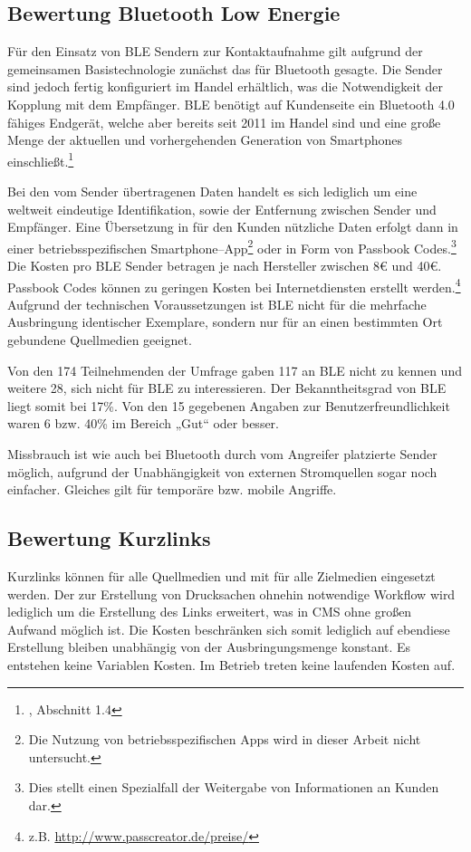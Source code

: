 
\subsection{Bewertung Bluetooth Low Energie} %
\label{sub:bewertung_bluetooth_low_energie}
Für den Einsatz von \ac{BLE} Sendern zur Kontaktaufnahme gilt aufgrund der gemeinsamen Basistechnologie zunächst das für Bluetooth gesagte. Die Sender sind jedoch fertig konfiguriert im Handel erhältlich, was die Notwendigkeit der Kopplung mit dem Empfänger. \ac{BLE} benötigt auf Kundenseite ein Bluetooth 4.0 fähiges Endgerät, welche aber bereits seit 2011 im Handel sind und eine große Menge der aktuellen und vorhergehenden Generation von Smartphones einschließt.\footnote{\cite{gilchrist}, Abschnitt 1.4}

Bei den vom Sender übertragenen Daten handelt es sich lediglich um eine weltweit eindeutige Identifikation, sowie der Entfernung zwischen Sender und Empfänger. Eine Übersetzung in für den Kunden nützliche Daten erfolgt dann in einer betriebsspezifischen Smartphone–App\footnote{Die Nutzung von betriebsspezifischen Apps wird in dieser Arbeit nicht untersucht.} oder in Form von Passbook Codes.\footnote{Dies stellt einen Spezialfall der Weitergabe von Informationen an Kunden dar.} Die Kosten pro BLE Sender betragen je nach Hersteller zwischen 8€ und 40€. Passbook Codes können zu geringen Kosten bei Internetdiensten erstellt werden.\footnote{z.B. \url{http://www.passcreator.de/preise/}} Aufgrund der technischen Voraussetzungen ist \ac{BLE} nicht für die mehrfache Ausbringung identischer Exemplare, sondern nur für an einen bestimmten Ort gebundene Quellmedien geeignet. 

Von den 174 Teilnehmenden der Umfrage gaben 117 an \ac{BLE} nicht zu kennen und weitere 28, sich nicht für \ac{BLE} zu interessieren. Der Bekanntheitsgrad von \ac{BLE} liegt somit bei 17\%. Von den 15 gegebenen Angaben zur Benutzerfreundlichkeit waren 6 bzw. 40\% im Bereich „Gut“ oder besser.

Missbrauch ist wie auch bei Bluetooth durch vom Angreifer platzierte Sender möglich, aufgrund der Unabhängigkeit von externen Stromquellen sogar noch einfacher. Gleiches gilt für temporäre bzw. mobile Angriffe.

\subsection{Bewertung Kurzlinks} %
\label{sub:bewertung_kurzlinks}
Kurzlinks können für alle Quellmedien und mit für alle Zielmedien eingesetzt werden. Der zur Erstellung von Drucksachen ohnehin notwendige Workflow wird lediglich um die Erstellung des Links erweitert, was in \ac{CMS} ohne großen Aufwand möglich ist. Die Kosten beschränken sich somit lediglich auf ebendiese Erstellung bleiben unabhängig von der Ausbringungsmenge konstant. Es entstehen keine Variablen Kosten. Im Betrieb treten keine laufenden Kosten auf.

